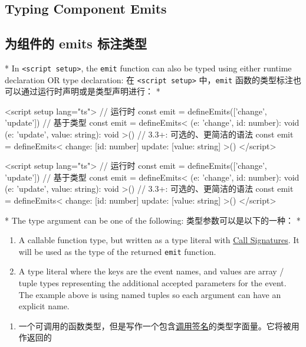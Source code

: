 \begin{paracol}{2}
\subsection{Typing Component Emits}
\switchcolumn
\subsection{为组件的 emits 标注类型}
\switchcolumn[0]*%
In \texttt{\textless{}script\ setup\textgreater{}}, the \texttt{emit}
function can also be typed using either runtime declaration OR type
declaration:
\switchcolumn
在 \texttt{\textless{}script\ setup\textgreater{}} 中，\texttt{emit}
函数的类型标注也可以通过运行时声明或是类型声明进行：
\switchcolumn[0]*%
\begin{codeTs}
<script setup lang="ts">
// 运行时
const emit = defineEmits(['change', 'update'])
// 基于类型
const emit = defineEmits<{
  (e: 'change', id: number): void
  (e: 'update', value: string): void
}>()
// 3.3+: 可选的、更简洁的语法
const emit = defineEmits<{
  change: [id: number]
  update: [value: string]
}>()
</script>
\end{codeTs}
\switchcolumn
\begin{codeTs}
<script setup lang="ts">
// 运行时
const emit = defineEmits(['change', 'update'])
// 基于类型
const emit = defineEmits<{
  (e: 'change', id: number): void
  (e: 'update', value: string): void
}>()
// 3.3+: 可选的、更简洁的语法
const emit = defineEmits<{
  change: [id: number]
  update: [value: string]
}>()
</script>
\end{codeTs}
\switchcolumn[0]*%
The type argument can be one of the following:
\switchcolumn
类型参数可以是以下的一种：
\switchcolumn[0]*%
\begin{enumerate}
\item
  A callable function type, but written as a type literal with
  \href{https://www.typescriptlang.org/docs/handbook/2/functions.html\#call-signatures}{Call
  Signatures}. It will be used as the type of the returned \texttt{emit}
  function.
\item
  A type literal where the keys are the event names, and values are
  array / tuple types representing the additional accepted parameters
  for the event. The example above is using named tuples so each
  argument can have an explicit name.
\end{enumerate}
\switchcolumn
\begin{enumerate}
\item
  一个可调用的函数类型，但是写作一个包含\href{https://www.typescriptlang.org/docs/handbook/2/functions.html\#call-signatures}{调用签名}的类型字面量。它将被用作返回的

\end{enumerate}
\end{paracol}

